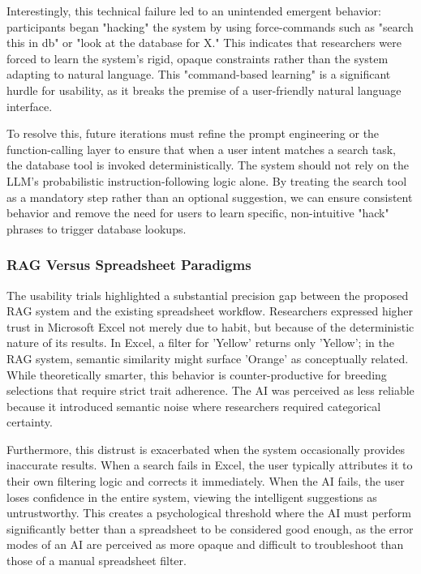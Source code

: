 \documentclass[journal]{./IEEE/IEEEtran}
\begin{document}
Interestingly, this technical failure led to an unintended emergent behavior: participants began "hacking" the system by using force-commands such as "search this in db" or "look at the database for X." This indicates that researchers were forced to learn the system's rigid, opaque constraints rather than the system adapting to natural language. This "command-based learning" is a significant hurdle for usability, as it breaks the premise of a user-friendly natural language interface.

To resolve this, future iterations must refine the prompt engineering or the function-calling layer to ensure that when a user intent matches a search task, the database tool is invoked deterministically. The system should not rely on the LLM's probabilistic instruction-following logic alone. By treating the search tool as a mandatory step rather than an optional suggestion, we can ensure consistent behavior and remove the need for users to learn specific, non-intuitive "hack" phrases to trigger database lookups.

\subsubsection{RAG Versus Spreadsheet Paradigms}
The usability trials highlighted a substantial precision gap between the proposed RAG system and the existing spreadsheet workflow. Researchers expressed higher trust in Microsoft Excel not merely due to habit, but because of the deterministic nature of its results. In Excel, a filter for 'Yellow' returns only 'Yellow'; in the RAG system, semantic similarity might surface 'Orange' as conceptually related. While theoretically smarter, this behavior is counter-productive for breeding selections that require strict trait adherence. The AI was perceived as less reliable because it introduced semantic noise where researchers required categorical certainty.

Furthermore, this distrust is exacerbated when the system occasionally provides inaccurate results. When a search fails in Excel, the user typically attributes it to their own filtering logic and corrects it immediately. When the AI fails, the user loses confidence in the entire system, viewing the intelligent suggestions as untrustworthy. This creates a psychological threshold where the AI must perform significantly better than a spreadsheet to be considered good enough, as the error modes of an AI are perceived as more opaque and difficult to troubleshoot than those of a manual spreadsheet filter.
\end{document}
